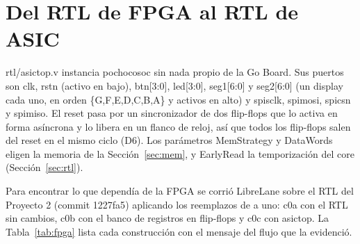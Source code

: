 \documentclass[11pt,a4paper]{article}
\DeclareRobustCommand{\sig}[1]{{\ttfamily\def\_{\textunderscore\allowbreak}#1}}
\begin{document}
\section{Del RTL de FPGA al RTL de ASIC}
\label{sec:asic}

\sig{rtl/asic\_top.v} instancia \sig{pochoco\_soc} sin nada propio de la Go Board. Sus puertos son \sig{clk}, \sig{rst\_n} (activo en bajo), \sig{btn[3:0]}, \sig{led[3:0]}, \sig{seg1[6:0]} y \sig{seg2[6:0]} (un display cada uno, en orden \{G,F,E,D,C,B,A\} y activos en alto) y \sig{spi\_sclk}, \sig{spi\_mosi}, \sig{spi\_cs\_n} y \sig{spi\_miso}. El reset pasa por un sincronizador de dos flip-flops que lo activa en forma asíncrona y lo libera en un flanco de reloj, así que todos los flip-flops salen del reset en el mismo ciclo (D6). Los parámetros \sig{MemStrategy} y \sig{DataWords} eligen la memoria de la Sección~\ref{sec:mem}, y \sig{EarlyRead} la temporización del core (Sección~\ref{sec:rtl}).

Para encontrar lo que dependía de la FPGA se corrió LibreLane sobre el RTL del Proyecto 2 (commit \sig{1227fa5}) aplicando los reemplazos de a uno: c0a con el RTL sin cambios, c0b con el banco de registros en flip-flops y c0c con \sig{asic\_top}. La Tabla~\ref{tab:fpga} lista cada construcción con el mensaje del flujo que la evidenció.
\end{document}
